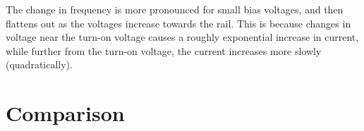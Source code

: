 \documentclass{article}
\begin{document}
The change in frequency is more pronounced for small bias voltages, and then flattens out as the voltages increase towards the rail.  This is because changes in voltage near the turn-on voltage causes a roughly exponential increase in current, while further from the turn-on voltage, the current increases more slowly (quadratically).  

\section{Comparison}
\end{document}

